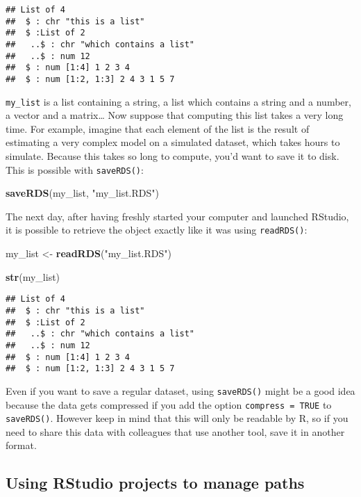 \documentclass[
]{article}
\newenvironment{Shaded}{\begin{snugshade}}{\end{snugshade}}
\newcommand{\KeywordTok}[1]{\textcolor[rgb]{0.13,0.29,0.53}{\textbf{#1}}}
\newcommand{\NormalTok}[1]{#1}
\newcommand{\StringTok}[1]{\textcolor[rgb]{0.31,0.60,0.02}{#1}}
\begin{document}
\begin{verbatim}
## List of 4
##  $ : chr "this is a list"
##  $ :List of 2
##   ..$ : chr "which contains a list"
##   ..$ : num 12
##  $ : num [1:4] 1 2 3 4
##  $ : num [1:2, 1:3] 2 4 3 1 5 7
\end{verbatim}

\texttt{my\_list} is a list containing a string, a list which contains a string and a number, a vector and
a matrix\ldots{} Now suppose that computing this list takes a very long time. For example, imagine that
each element of the list is the result of estimating a very complex model on a simulated
dataset, which takes hours to simulate. Because this takes so long to compute, you'd want to save
it to disk. This is possible with \texttt{saveRDS()}:

\begin{Shaded}
\begin{Highlighting}[]
\KeywordTok{saveRDS}\NormalTok{(my\_list, }\StringTok{"my\_list.RDS"}\NormalTok{)}
\end{Highlighting}
\end{Shaded}

The next day, after having freshly started your computer and launched RStudio, it is possible to
retrieve the object exactly like it was using \texttt{readRDS()}:

\begin{Shaded}
\begin{Highlighting}[]
\NormalTok{my\_list \textless{}{-}}\StringTok{ }\KeywordTok{readRDS}\NormalTok{(}\StringTok{"my\_list.RDS"}\NormalTok{)}

\KeywordTok{str}\NormalTok{(my\_list)}
\end{Highlighting}
\end{Shaded}

\begin{verbatim}
## List of 4
##  $ : chr "this is a list"
##  $ :List of 2
##   ..$ : chr "which contains a list"
##   ..$ : num 12
##  $ : num [1:4] 1 2 3 4
##  $ : num [1:2, 1:3] 2 4 3 1 5 7
\end{verbatim}

Even if you want to save a regular dataset, using \texttt{saveRDS()} might be a good idea because the data
gets compressed if you add the option \texttt{compress\ =\ TRUE} to \texttt{saveRDS()}. However keep in mind that
this will only be readable by R, so if you need to share this data with colleagues that use another
tool, save it in another format.

\hypertarget{using-rstudio-projects-to-manage-paths}{%
\subsection{Using RStudio projects to manage paths}\label{using-rstudio-projects-to-manage-paths}}
\end{document}

